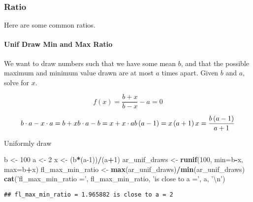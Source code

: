\documentclass[
]{book}
\newenvironment{Shaded}{\begin{snugshade}}{\end{snugshade}}
\newcommand{\CharTok}[1]{\textcolor[rgb]{0.31,0.60,0.02}{#1}}
\newcommand{\DataTypeTok}[1]{\textcolor[rgb]{0.13,0.29,0.53}{#1}}
\newcommand{\DecValTok}[1]{\textcolor[rgb]{0.00,0.00,0.81}{#1}}
\newcommand{\KeywordTok}[1]{\textcolor[rgb]{0.13,0.29,0.53}{\textbf{#1}}}
\newcommand{\NormalTok}[1]{#1}
\newcommand{\OperatorTok}[1]{\textcolor[rgb]{0.81,0.36,0.00}{\textbf{#1}}}
\newcommand{\StringTok}[1]{\textcolor[rgb]{0.31,0.60,0.02}{#1}}
\begin{document}
\hypertarget{ratio}{%
\subsubsection{Ratio}\label{ratio}}

Here are some common ratios.

\hypertarget{unif-draw-min-and-max-ratio}{%
\paragraph{Unif Draw Min and Max Ratio}\label{unif-draw-min-and-max-ratio}}

We want to draw numbers such that we have some mean \(b\), and that the possible maximum and minimum value drawn are at most \(a\) times apart. Given \(b\) and \(a\), solve for \(x\).

\[
f(x) = \frac{b+x}{b-x} - a = 0
\]

\[
b \cdot a - x \cdot a = b + x \\
b \cdot a - b = x + x \cdot a  \\
b \left(a - 1\right) = x \left( a+ 1\right)  \\
x = \frac{b\left(a-1\right)}{a+1}\\
\]

Uniformly draw

\begin{Shaded}
\begin{Highlighting}[]
\NormalTok{b <-}\StringTok{ }\DecValTok{100}
\NormalTok{a <-}\StringTok{ }\DecValTok{2}
\NormalTok{x <-}\StringTok{ }\NormalTok{(b}\OperatorTok{*}\NormalTok{(a}\DecValTok{-1}\NormalTok{))}\OperatorTok{/}\NormalTok{(a}\OperatorTok{+}\DecValTok{1}\NormalTok{)}
\NormalTok{ar_unif_draws <-}\StringTok{ }\KeywordTok{runif}\NormalTok{(}\DecValTok{100}\NormalTok{, }\DataTypeTok{min=}\NormalTok{b}\OperatorTok{-}\NormalTok{x, }\DataTypeTok{max=}\NormalTok{b}\OperatorTok{+}\NormalTok{x)}
\NormalTok{fl_max_min_ratio <-}\StringTok{ }\KeywordTok{max}\NormalTok{(ar_unif_draws)}\OperatorTok{/}\KeywordTok{min}\NormalTok{(ar_unif_draws)}
\KeywordTok{cat}\NormalTok{(}\StringTok{'fl_max_min_ratio ='}\NormalTok{, fl_max_min_ratio, }\StringTok{'is close to a ='}\NormalTok{, a, }\StringTok{'}\CharTok{\textbackslash{}n}\StringTok{'}\NormalTok{)}
\end{Highlighting}
\end{Shaded}

\begin{verbatim}
## fl_max_min_ratio = 1.965882 is close to a = 2
\end{verbatim}
\end{document}
